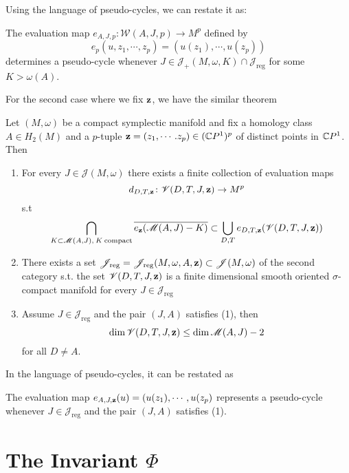 \documentclass[twoside]{article}
\begin{document}
Using the language of pseudo-cycles, we can restate it as:

\begin{theorem}
    The evaluation map $e_{A,J,p}\colon \mathscr{W}(A,J,p)\rightarrow M^p$ defined by 
    \[e_p(u,z_1,\cdots,z_p)=(u(z_1),\cdots,u(z_p))\]
    determines a pseudo-cycle whenever $J\in\mathscr{J}_+(M,\omega,K)\cap \mathscr{J}_{\textrm{reg}}$ 
    for some $K>\omega(A)$.
\end{theorem}

For the second case where we fix $\mathbf{z}$, we have the similar theorem

\begin{theorem}
    Let $(M,\omega)$ be a compact symplectic manifold and fix a homology class 
    $A\in H_2(M)$ and a $p$-tuple $\mathbf{z}=(z_1,\cdots.z_p)\in(\mathbb{C}P^{1})^p$ of distinct points in $\mathbb{C}P^{1}$. Then
    \begin{enumerate}
        \item For every $J\in\mathscr{J}(M,\omega)$ there exists a finite collection of evaluation maps
        \[d_{D,T,\mathbf{z}}\colon \mathscr{V}(D,T,J,\mathbf{z})\rightarrow M^p\]
        s.t
        \[\bigcap_{K\subset \mathscr{M}(A,J),\: K\: \textrm{compact}}\overline{e_{\mathbf{z}}(\mathscr{M}(A,J)-K)}\subset\bigcup_{D,T}e_{D,T,\mathbf{z}}(\mathscr{V}(D,T,J,\mathbf{z}))\]
        \item There exists a set 
        $\mathscr{J}_{\textrm{reg}}=\mathscr{J}_{\textrm{reg}}(M,\omega,A,\mathbf{z})\subset \mathscr{J}(M,\omega)$ 
        of the second category s.t. the set $\mathscr{V}(D,T,J,\mathbf{z})$ is a 
        finite dimensional smooth oriented $\sigma$-compact manifold for every $J\in\mathscr{J}_{\textrm{reg}}$
        \item  Assume $J\in \mathscr{J}_{\textrm{reg}}$ and the pair $(J,A)$ satisfies (1), then
        \[\dim\mathscr{V}(D,T,J,\mathbf{z})\leq\dim\mathscr{M}(A,J)-2\]
        for all $D\neq A$.
    \end{enumerate}
\end{theorem}

In the language of pseudo-cycles, it can be restated as

\begin{theorem}
The evaluation map $e_{A,J,\mathbf{z}}(u)=(u(z_1),\cdots,u(z_p)$ represents 
a pseudo-cycle whenever $J\in \mathscr{J}_{\textrm{reg}}$ and the pair $(J,A)$ satisfies (1).
\end{theorem}

\section{The Invariant \texorpdfstring{$\Phi$}{Φ}}
\end{document}
